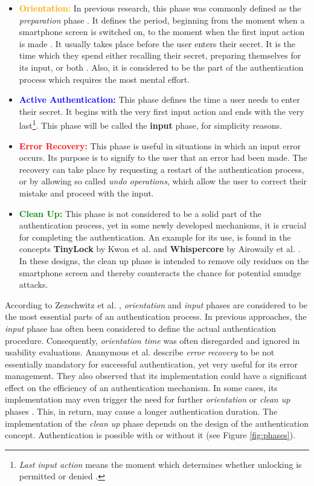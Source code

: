 \begin{itemize}
    \item \textbf{\textcolor{orange}{Orientation:}} In previous research, this phase was commonly defined as the \textit{preparation} phase . It defines the period, beginning from the moment when a smartphone screen is switched on, to the moment when the first input action is made . It usually takes place before the user enters their secret. It is the time which they spend either recalling their secret, preparing themselves for its input, or both . Also, it is considered to be the part of the authentication process which requires the most mental effort.  
    \item \textbf{\textcolor{blue}{Active Authentication:}} This phase defines the time a user needs to enter their secret. It begins with the very first input action and ends with the very last\footnote{ \textit{Last input action} means the moment which determines whether unlocking is permitted or denied \cite{Zezschwitz}.}. This phase will be called the \textbf{input} phase, for simplicity reasons.
    \item \textbf{\textcolor{red}{Error Recovery:}} This phase is useful in situations in which an input error occurs. Its purpose is to signify to the user that an error had been made. The recovery can take place by requesting a restart of the authentication process, or by allowing so called \textit{undo operations}, which allow the user to correct their mistake and proceed with the input. 
    \item \textbf{\textcolor{green}{Clean Up:}} This phase is not considered to be a solid part of the authentication process, yet in some newly developed mechanisms, it is crucial for completing the authentication. An example for its use, is found in the concepts \textbf{TinyLock} by Kwon et al. \cite{kwon} and \textbf{Whispercore} by Airowaily et al. \cite{Airowaily}. In these designs, the clean up phase is intended to remove oily residues on the smartphone screen and thereby counteracts the chance for potential smudge attacks. 
\end{itemize}

According to Zezschwitz et al. \cite{Zezschwitz}, \textit{orientation} and \textit{input} phases are considered to be the most essential parts of an authentication process. In previous approaches, the \textit{input} phase has often been considered to define the actual authentication procedure. Consequently, \textit{orientation time} was often disregarded and ignored in usability evaluations. Ananymous et al. \cite{Zezschwitz} describe \textit{error recovery} to be not essentially mandatory for successful authentication, yet very useful for its error management. They also observed that its implementation could have a significant effect on the efficiency of an authentication mechanism. In some cases, its implementation may even trigger the need for further \textit{orientation} or \textit{clean up} phases \cite{Zezschwitz}. This, in return, may cause a longer authentication duration. The implementation of the \textit{clean up} phase depends on the design of the authentication concept. Authentication is possible with or without it (see Figure \ref{fig:phases}). \\

